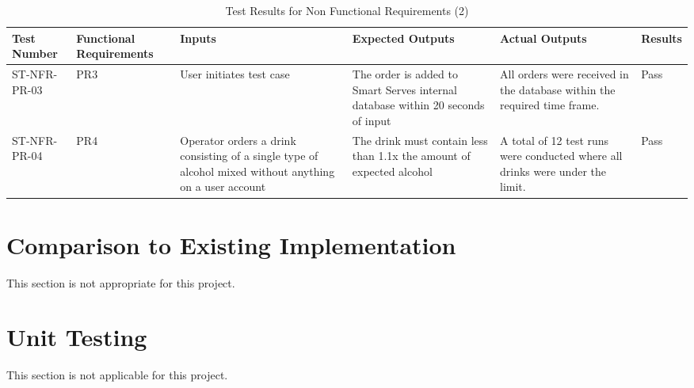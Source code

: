 \documentclass[12pt, titlepage]{article}
\begin{document}
    \begin{rotate}{}
    \begin{landscape}
        \begin{table}
           \begin{tabular}{|p{2.75cm}|p{2.5cm}|p{4cm}|p{4.75cm}|p{4.25cm}|p{1.5cm}|}
            \hline
            Test Number & Functional \newline Requirements & Inputs & Expected Outputs & Actual Outputs & Results  \\ [0.5ex]
            \hline\hline
            ST-NFR-PR-03 & PR3 & User initiates test case & The order is added to Smart Serves internal database within 20 seconds of input & All orders were received in the database within the required time frame. & Pass \\
            \hline
            ST-NFR-PR-04 & PR4 & Operator orders a drink consisting of a single type of alcohol mixed without anything on a user account & The drink must contain less than 1.1x the amount of expected alcohol & A total of 12 test runs were conducted where all drinks were under the limit. & Pass \\
            \hline
            \hline
            \end{tabular}
            \caption{Test Results for Non Functional Requirements (2)}
            \label{tab: caption}
        \end{table}
     \end{landscape}
    \end{rotate}



	
\section{Comparison to Existing Implementation}	

This section is not appropriate for this project.

\section{Unit Testing}
This section is not applicable for this project.
\end{document}
